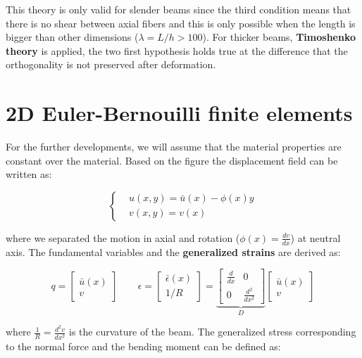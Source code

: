 	This theory is only valid for slender beams since the third condition means that there is no shear between axial fibers and this is only possible when the length is bigger than other dimensions ($\lambda = L/h > 100$). For thicker beams, \textbf{Timoshenko theory} is applied, the two first hypothesis holds true at the difference that the orthogonality is not preserved after deformation.
	
\section{2D Euler-Bernouilli finite elements}
	For the further developments, we will assume that the material properties are constant over the material. Based on the figure the displacement field can be written as: 
	
	\begin{equation}
	\left\{ \begin{aligned}
	& u(x,y) = \bar{u}(x) - \phi (x)y\\
	& v(x,y) = v(x)
	\end{aligned}	
	 \right.
	\end{equation}
	
	where we separated the motion in axial and rotation ($\phi (x)= \frac{dv}{dx}$) at neutral axis. The fundamental variables and the \textbf{generalized strains} are derived as: 
	
	\begin{equation}
	q = \left[
	\begin{array}{c}
	\bar{u}(x)\\
	v
	\end{array}		
	\right]
	\qquad
	\epsilon = \left[
	\begin{array}{c}
	\bar{\epsilon}(x)\\
	1/R
	\end{array}		
	\right]
	= 
	\underbrace{
	\left[
	\begin{array}{cc}
	\frac{d}{dx} & 0 \\
	0 & \frac{d^2}{dx^2}
	\end{array}		
	\right]}_{D}
	\left[
	\begin{array}{c}
	\bar{u}(x)\\
	v
	\end{array}		
	\right]
	\end{equation}
	
		where $\frac{1}{R} = \frac{d^2v}{dx^2}$ is the curvature of the beam. The generalized stress corresponding to the normal force and the bending moment can be defined as: 
	
